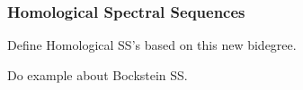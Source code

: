 \documentclass{beamer}
\begin{document}

\begin{frame}
	\frametitle{Homological Spectral Sequences}

	{\color{red}Define Homological SS's based on this new bidegree.}
\end{frame}

\begin{frame}
	{\color{red}Do example about Bockstein SS.}
\end{frame}
\end{document}
